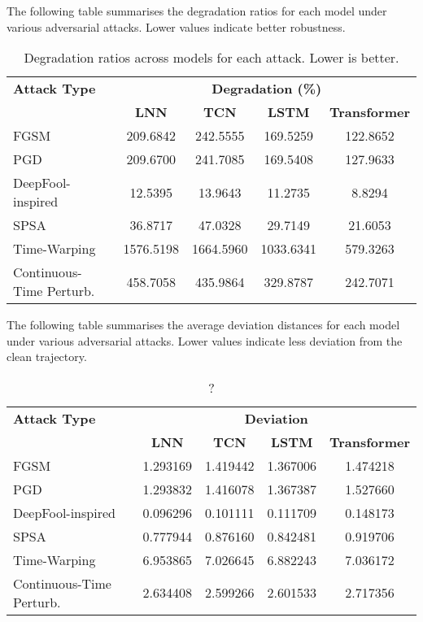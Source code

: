 The following table summarises the degradation ratios for each model under various adversarial attacks. Lower values indicate better robustness.

\begin{table}[H]
    \centering
    \small
    \begin{tabular}{|l|cccc|}
    \hline
    \textbf{Attack Type} & \multicolumn{4}{c|}{\textbf{Degradation (\%)}} \\
    \cline{2-5}
     & \textbf{LNN} & \textbf{TCN} & \textbf{LSTM} & \textbf{Transformer} \\
    \hline
    FGSM                     & 209.6842 & 242.5555 & 169.5259 & 122.8652 \\
    PGD                      & 209.6700 & 241.7085 & 169.5408 & 127.9633 \\
    DeepFool-inspired        & 12.5395 & 13.9643 & 11.2735 & 8.8294 \\
    SPSA                     & 36.8717 & 47.0328 & 29.7149 & 21.6053 \\
    Time-Warping             & 1576.5198 & 1664.5960 & 1033.6341 & 579.3263 \\
    Continuous-Time Perturb. & 458.7058 & 435.9864 & 329.8787 & 242.7071 \\
    \hline
    \end{tabular}
    \caption{Degradation ratios across models for each attack. Lower is better.}
    \label{tab:attack_results_degradation}
\end{table}

The following table summarises the average deviation distances for each model under various adversarial attacks. Lower values indicate less deviation from the clean trajectory.

\begin{table}[H]
    \centering
    \small
    \begin{tabular}{|l|cccc|}
    \hline
    \textbf{Attack Type} & \multicolumn{4}{c|}{\textbf{Deviation}} \\
    \cline{2-5}
     & \textbf{LNN} & \textbf{TCN} & \textbf{LSTM} & \textbf{Transformer} \\
    \hline
    FGSM                     & 1.293169 & 1.419442 & 1.367006 & 1.474218 \\
    PGD                      & 1.293832 & 1.416078 & 1.367387 & 1.527660 \\
    DeepFool-inspired        & 0.096296 & 0.101111 & 0.111709 & 0.148173 \\
    SPSA                     & 0.777944 & 0.876160 & 0.842481 & 0.919706 \\
    Time-Warping             & 6.953865 & 7.026645 & 6.882243 & 7.036172 \\
    Continuous-Time Perturb. & 2.634408 & 2.599266 & 2.601533 & 2.717356 \\
    \hline
    \end{tabular}
    \caption{?}
    \label{tab:attack_results_deviation}
\end{table}

